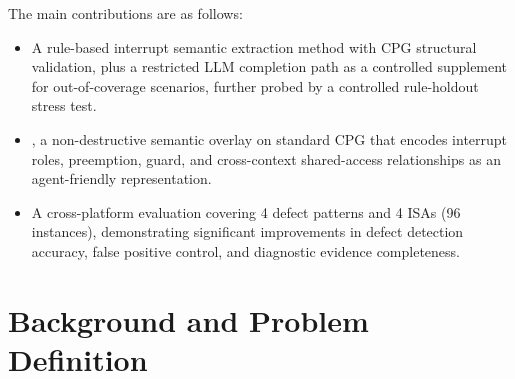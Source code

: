 \documentclass[a4paper,UKenglish,cleveref, autoref, thm-restate]{lipics-v2021}
\begin{document}



The main contributions are as follows:
\begin{itemize}
  \item A rule-based interrupt semantic extraction method with CPG structural validation, plus a restricted LLM completion path as a controlled supplement for out-of-coverage scenarios, further probed by a controlled rule-holdout stress test.
  \item \iacpg, a non-destructive semantic overlay on standard CPG that encodes interrupt roles, preemption, guard, and cross-context shared-access relationships as an agent-friendly representation.
  \item A cross-platform evaluation covering 4 defect patterns and 4 ISAs (96 instances), demonstrating significant improvements in defect detection accuracy, false positive control, and diagnostic evidence completeness.
\end{itemize}

\section{Background and Problem Definition}
\end{document}
